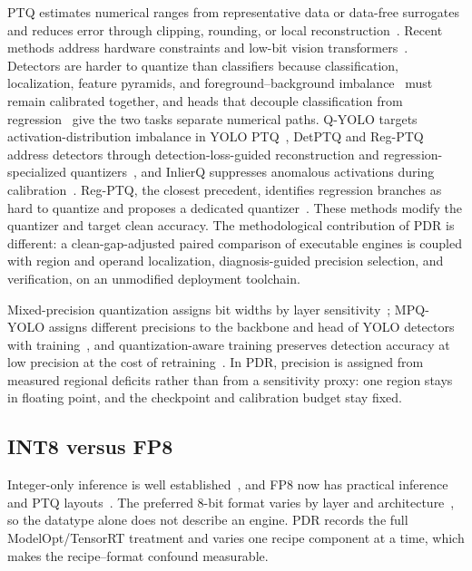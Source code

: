 \documentclass[a4paper,fleqn]{cas-dc}
\begin{document}
PTQ estimates numerical ranges from representative data or data-free surrogates and reduces error through clipping, rounding, or local reconstruction~\citep{cai2020zeroq,nagel2020adaround,hubara2021smallcalibration,li2021brecq,wei2022qdrop,liu2023pdquant}. Recent methods address hardware constraints and low-bit vision transformers~\citep{zhao2026haqvit,ding2026raptq,jiang2025adfqvit}. Detectors are harder to quantize than classifiers because classification, localization, feature pyramids, and foreground--background imbalance~\citep{oksuz2021imbalance} must remain calibrated together, and heads that decouple classification from regression~\citep{tian2019fcos,zuo2024tgadhead} give the two tasks separate numerical paths. Q-YOLO targets activation-distribution imbalance in YOLO PTQ~\citep{wang2023qyolo}, DetPTQ and Reg-PTQ address detectors through detection-loss-guided reconstruction and regression-specialized quantizers~\citep{niu2023detptq,ding2024regptq}, and InlierQ suppresses anomalous activations during calibration~\citep{kim2026inlierq}. Reg-PTQ, the closest precedent, identifies regression branches as hard to quantize and proposes a dedicated quantizer~\citep{ding2024regptq}. These methods modify the quantizer and target clean accuracy. The methodological contribution of PDR is different: a clean-gap-adjusted paired comparison of executable engines is coupled with region and operand localization, diagnosis-guided precision selection, and verification, on an unmodified deployment toolchain.

Mixed-precision quantization assigns bit widths by layer sensitivity~\citep{yao2021hawqv3,huang2025hessianmp,sun2026bitflipmpq}; MPQ-YOLO assigns different precisions to the backbone and head of YOLO detectors with training~\citep{liu2024mpqyolo}, and quantization-aware training preserves detection accuracy at low precision at the cost of retraining~\citep{chen2021aqd}. In PDR, precision is assigned from measured regional deficits rather than from a sensitivity proxy: one region stays in floating point, and the checkpoint and calibration budget stay fixed.

\subsection{INT8 versus FP8}

Integer-only inference is well established~\citep{jacob2018integer,yao2021hawqv3,wu2020integer}, and FP8 now has practical inference and PTQ layouts~\citep{micikevicius2022fp8,kuzmin2022fp8,shen2024fp8}. The preferred 8-bit format varies by layer and architecture~\citep{vanbaalen2023fp8int8}, so the datatype alone does not describe an engine. PDR records the full ModelOpt/TensorRT treatment and varies one recipe component at a time, which makes the recipe--format confound measurable.
\end{document}
